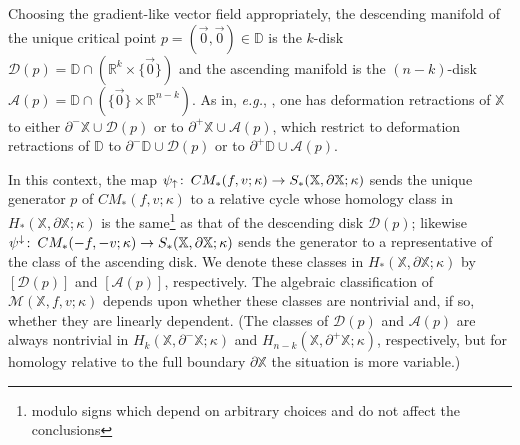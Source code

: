 \documentclass[11pt]{amsart}
\theoremstyle{definition}
\theoremstyle{remark}
\numberwithin{equation}{section}
\def\co{\colon\thinspace}
\def\R{\mathbb{R}}
\begin{document}
Choosing the gradient-like vector field appropriately, the descending manifold of the unique critical point $p=(\vec{0},\vec{0})\in\mathbb{D}$ is the $k$-disk $\mathcal{D}(p)=\mathbb{D}\cap(\R^k\times\{\vec{0}\})$
and the ascending manifold is the $(n-k)$-disk $\mathcal{A}(p)=\mathbb{D}\cap (\{\vec{0}\}\times\R^{n-k})$.  As in, \emph{e.g.}, \cite[Theorem 3.14]{Milhcob}, one has deformation retractions of $\mathbb{X}$ to either $\partial^-\mathbb{X}\cup \mathcal{D}(p)$ or to $\partial^+\mathbb{X}\cup \mathcal{A}(p)$, which restrict to  deformation retractions of $\mathbb{D}$ to $\partial^-\mathbb{D}\cup \mathcal{D}(p)$ or to $\partial^+\mathbb{D}\cup\mathcal{A}(p)$.

In this context, the map $\psi_{\uparrow}\co CM_*(f,v;\kappa)\to S_*(\mathbb{X},\partial\mathbb{X};\kappa)$ sends the unique generator $p$ of $CM_*(f,v;\kappa)$ to a relative cycle whose homology class in $H_*(\mathbb{X},\partial\mathbb{X};\kappa)$ is the same\footnote{modulo signs which depend on arbitrary choices and do not affect the conclusions} as that of the descending disk $\mathcal{D}(p)$; likewise $\psi^{\downarrow}\co CM_*(-f,-v;\kappa)\to S_*(\mathbb{X},\partial\mathbb{X};\kappa)$ sends the generator to a representative of the class of the ascending disk.  We denote these classes in $H_*(\mathbb{X},\partial\mathbb{X};\kappa)$ by $[\mathcal{D}(p)]$ and $[\mathcal{A}(p)]$, respectively.  The algebraic classification of $\mathcal{M}(\mathbb{X},f,v;\kappa)$ depends upon whether these classes are nontrivial and, if so, whether they are linearly dependent.  (The classes of $\mathcal{D}(p)$ and $\mathcal{A}(p)$ are always nontrivial in $H_k(\mathbb{X},\partial^-\mathbb{X};\kappa)$ and $H_{n-k}(\mathbb{X},\partial^+\mathbb{X};\kappa)$, respectively, but for homology relative to the full boundary $\partial\mathbb{X}$ the situation is more variable.)
\end{document}
